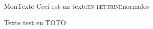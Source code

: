 \documentclass[%
fontsize=10%
,a6paper%
,DIV=15%
]{scrartcl}
\title{\centrer{Grandes Antiennes de l'Avent}}
\author{ou Antiennes O}
\date{du 17 au 23 décembre}
\begin{document}
    \newfontfamily{}
    \def\gretextformat#1{{\fontsize{\taillepolice}{\taillepolice}\selectfont #1}}
    \def\greinitialformat#1{{\lettrines #1}}
    
    \newfontfamily{}

\newfontfamily{}
\renewcommand{\LettrineFontHook}{\malettrine\color{black}}


\newcommand{\toto}[1]
   {{\selectfont #1}}
\toto{MonTexte}
\lettrine{Ceci est un texte}{en lettrine}{normales}


{\fontencoding{\encodingdefault}
\fontseries{\seriesdefault}
\fontshape{\shapedefault}
\selectfont
Texte test en TOTO}
\end{document}
